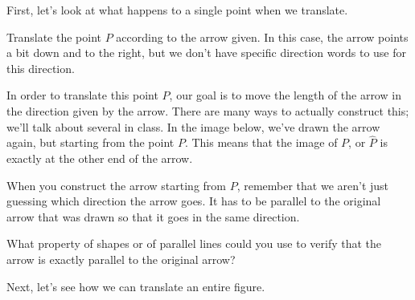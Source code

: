 \documentclass{ximera}
\begin{document}
First, let's look at what happens to a single point when we translate.
\begin{example}
Translate the point $P$ according to the arrow given. In this case, the arrow points a bit down and to the right, but we don't have specific direction words to use for this direction.
\begin{image}
\end{image}
In order to translate this point $P$, our goal is to move the length of the arrow in the direction given by the arrow. There are many ways to actually construct this; we'll talk about several in class. In the image below, we've drawn the arrow again, but starting from the point $P$. This means that the image of $P$, or $\hat{P}$ is exactly at the other end of the arrow.
\begin{image}
\end{image}
\end{example}
When you construct the arrow starting from $P$, remember that we aren't just guessing which direction the arrow goes. It has to be parallel to the original arrow that was drawn so that it goes in the same direction. 

\begin{question}
What property of shapes or of parallel lines could you use to verify that the arrow is exactly parallel to the original arrow?
\begin{multipleChoice}
\end{multipleChoice}
\end{question}


Next, let's see how we can translate an entire figure.
\end{document}
